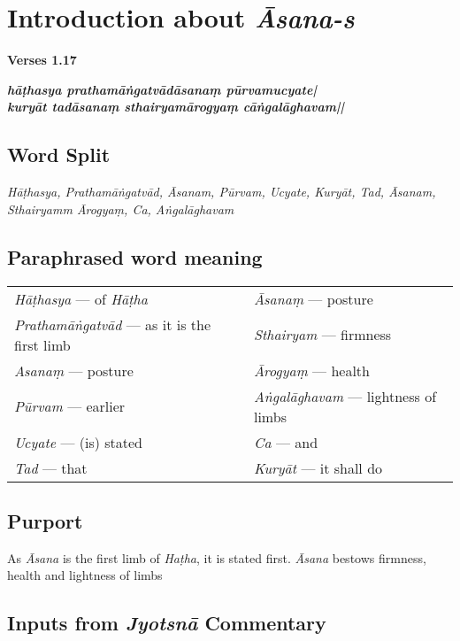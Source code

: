 \section*{Introduction about \textit{Āsana-s}}


\noindent \textbf{Verses 1.17}

\begin{shloka}
\textit{\textbf{hāṭhasya prathamāṅgatvādāsanaṃ pūrvamucyate|}\\
\textbf{kuryāt tadāsanaṃ sthairyamārogyaṃ  cāṅgalāghavam||}}
\end{shloka}

\subsection*{Word Split}

\textit{Hāṭhasya, Prathamāṅgatvād, Āsanam, Pūrvam, Ucyate, Kuryāt, Tad, Āsanam, Sthairyamm Ārogyaṃ,  Ca, Aṅgalāghavam}

\subsection*{Paraphrased word meaning}

\begin{longtable}{>{\noindent\raggedright}p{5cm}>{\noindent\raggedright}p{5cm}}
\textit{Hāṭhasya} --- of \textit{Hāṭha} & \textit{Āsanaṃ} --- posture\tabularnewline
\textit{Prathamāṅgatvād} --- as it is the first limb & \textit{Sthairyam} --- firmness\tabularnewline
\textit{Asanaṃ} --- posture & \textit{Ārogyaṃ} --- health\tabularnewline
\textit{Pūrvam} --- earlier & \textit{Aṅgalāghavam} --- lightness of limbs\tabularnewline
\textit{Ucyate} --- (is) stated & \textit{Ca} --- and\tabularnewline
\textit{Tad} --- that & \textit{Kuryāt} --- it shall do
\end{longtable}


\subsection*{Purport}


As \textit{Āsana} is the first limb of \textit{Haṭha}, it is stated first. \textit{Āsana} bestows firmness, health and lightness of limbs

\subsection*{Inputs from \textit{Jyotsnā} Commentary}

